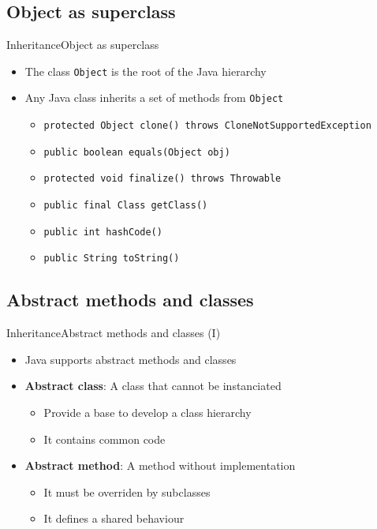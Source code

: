 \documentclass[10pt,compress]{beamer} %
\begin{document}
\subsection{Object as superclass}
\begin{frame}{Inheritance}{Object as superclass}
	\begin{itemize}
	\item The class \texttt{Object} is the root of the Java hierarchy
	\item Any Java class inherits a set of methods from \texttt{Object}
	\begin{itemize}
		\item \texttt{protected Object clone() throws CloneNotSupportedException}
		\item \texttt{public boolean equals(Object obj)}
		\item \texttt{protected void finalize() throws Throwable}
		\item \texttt{public final Class getClass()}
		\item \texttt{public int hashCode()}
		\item \texttt{public String toString()}
	\end{itemize}
	\end{itemize}
\end{frame}

\subsection{Abstract methods and classes}
\begin{frame}{Inheritance}{Abstract methods and classes (I)}
	\begin{itemize}
	\item Java supports abstract methods and classes
	\item \textbf{Abstract class}: A class that cannot be instanciated
		\begin{itemize}
		\item Provide a base to develop a class hierarchy
		\item It contains common code
		\end{itemize}
	\item \textbf{Abstract method}: A method without implementation
		\begin{itemize}
		\item It must be overriden by subclasses
		\item It defines a shared behaviour
		\end{itemize}
	\end{itemize}
\end{frame}
\end{document}
